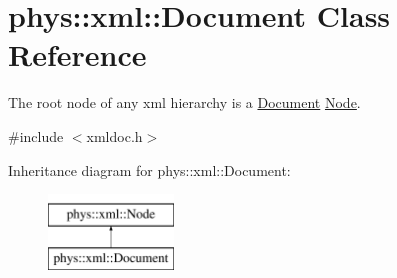 \hypertarget{classphys_1_1xml_1_1Document}{
\section{phys::xml::Document Class Reference}
\label{dd/d44/classphys_1_1xml_1_1Document}
}


The root node of any xml hierarchy is a \hyperlink{classphys_1_1xml_1_1Document}{Document} \hyperlink{classphys_1_1xml_1_1Node}{Node}.  




{\ttfamily \#include $<$xmldoc.h$>$}

Inheritance diagram for phys::xml::Document:\begin{figure}[H]
\begin{center}
\leavevmode
\includegraphics[height=2.000000cm]{dd/d44/classphys_1_1xml_1_1Document}
\end{center}
\end{figure}
